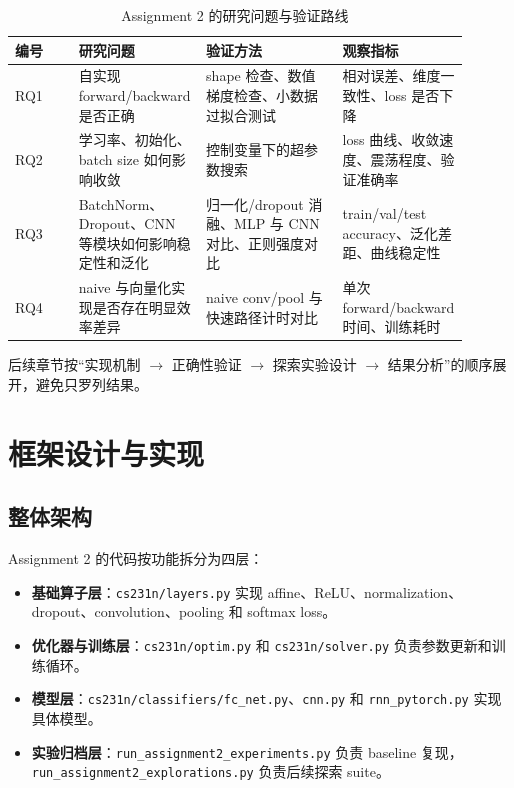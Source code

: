 \documentclass[UTF8]{ctexart}
\begin{document}
\begin{table}[H]
\centering
\begin{tabular}{p{0.14\linewidth}p{0.28\linewidth}p{0.30\linewidth}p{0.18\linewidth}}
\toprule
编号 & 研究问题 & 验证方法 & 观察指标 \\
\midrule
RQ1 & 自实现 forward/backward 是否正确 & shape 检查、数值梯度检查、小数据过拟合测试 & 相对误差、维度一致性、loss 是否下降 \\
RQ2 & 学习率、初始化、batch size 如何影响收敛 & 控制变量下的超参数搜索 & loss 曲线、收敛速度、震荡程度、验证准确率 \\
RQ3 & BatchNorm、Dropout、CNN 等模块如何影响稳定性和泛化 & 归一化/dropout 消融、MLP 与 CNN 对比、正则强度对比 & train/val/test accuracy、泛化差距、曲线稳定性 \\
RQ4 & naive 与向量化实现是否存在明显效率差异 & naive conv/pool 与快速路径计时对比 & 单次 forward/backward 时间、训练耗时 \\
\bottomrule
\end{tabular}
\caption{Assignment 2 的研究问题与验证路线}
\end{table}

后续章节按“实现机制 $\rightarrow$ 正确性验证 $\rightarrow$ 探索实验设计 $\rightarrow$ 结果分析”的顺序展开，避免只罗列结果。

\section{框架设计与实现}

\subsection{整体架构}

Assignment 2 的代码按功能拆分为四层：
\begin{itemize}
  \item \textbf{基础算子层}：\texttt{cs231n/layers.py} 实现 affine、ReLU、normalization、dropout、convolution、pooling 和 softmax loss。
  \item \textbf{优化器与训练层}：\texttt{cs231n/optim.py} 和 \texttt{cs231n/solver.py} 负责参数更新和训练循环。
  \item \textbf{模型层}：\texttt{cs231n/classifiers/fc\_net.py}、\texttt{cnn.py} 和 \texttt{rnn\_pytorch.py} 实现具体模型。
  \item \textbf{实验归档层}：\texttt{run\_assignment2\_experiments.py} 负责 baseline 复现，\texttt{run\_assignment2\_explorations.py} 负责后续探索 suite。
\end{itemize}
\end{document}

